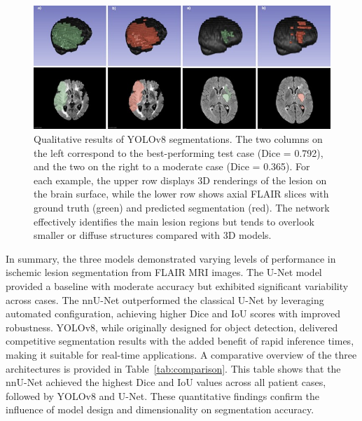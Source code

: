 \documentclass[12pt]{article}
\begin{document}
\begin{figure}[tp]
    \centering
    \includegraphics[width=\textwidth]{figures/Figure 6.jpg}
    \caption{Qualitative results of YOLOv8 segmentations. The two columns on the left correspond to the best-performing test case (Dice = 0.792), and the two on the right to a moderate case (Dice = 0.365). For each example, the upper row displays 3D renderings of the lesion on the brain surface, while the lower row shows axial FLAIR slices with ground truth (green) and predicted segmentation (red). The network effectively identifies the main lesion regions but tends to overlook smaller or diffuse structures compared with 3D models.}\label{fig:yolov8_qualitative}
\end{figure}



In summary, the three models demonstrated varying levels of performance in ischemic lesion segmentation from FLAIR MRI images. The U-Net model provided a baseline with moderate accuracy but exhibited significant variability across cases. The nnU-Net outperformed the classical U-Net by leveraging automated configuration, achieving higher Dice and IoU scores with improved robustness. YOLOv8, while originally designed for object detection, delivered competitive segmentation results with the added benefit of rapid inference times, making it suitable for real-time applications. A comparative overview of the three architectures is provided in Table~\ref{tab:comparison}. This table shows that the nnU-Net achieved the highest Dice and IoU values across all patient cases, followed by YOLOv8 and U-Net. These quantitative findings confirm the influence of model design and dimensionality on segmentation accuracy.
\end{document}
